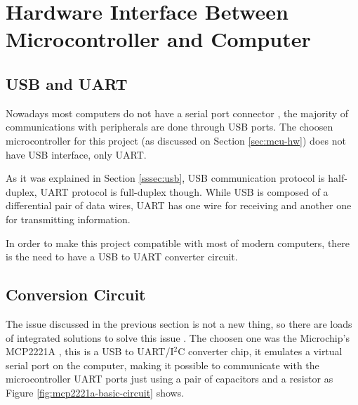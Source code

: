\section{Hardware Interface Between Microcontroller and Computer}\label{sec:hardware-interface-between-mcu-and-computer}

	\subsection{USB and UART}\label{ssec:usb-and-uart}
		Nowadays most computers do not have a serial port connector \cite{serialPortNeverSayDie}, the majority of communications with peripherals are done through USB ports. The choosen microcontroller for this project (as discussed on Section \ref{sec:mcu-hw}) does not have USB interface, only UART. 

		As it was explained in Section \ref{sssec:usb}, USB communication protocol is half-duplex, UART protocol is full-duplex though. While USB is composed of a differential pair of data wires, UART has one wire for receiving and another one for transmitting information. 

		In order to make this project compatible with most of modern computers, there is the need to have a USB to UART converter circuit.

	\subsection{Conversion Circuit}\label{ssec:usb-uart-conversion-circuit}

		The issue discussed in the previous section is not a new thing, so there are loads of integrated solutions to solve this issue \cite{usbSerialAdapter}. The choosen one was the Microchip's MCP2221A \cite{mcp2221a-datasheet}, this is a USB to UART/I$^2$C converter chip, it emulates a virtual serial port on the computer, making it possible to communicate with the microcontroller UART ports just using a pair of capacitors and a resistor as Figure \ref{fig:mcp2221a-basic-circuit} shows.

